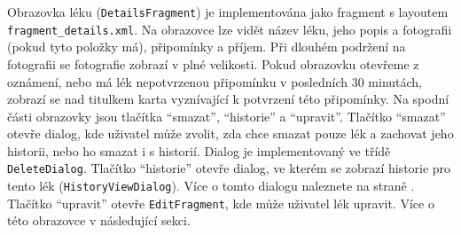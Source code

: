 \documentclass[../TakeYourPill.tex]{subfiles}
\begin{document}
Obrazovka léku (\texttt{DetailsFragment}) je implementována jako fragment s layoutem \texttt{fragment\_details.xml}. Na obrazovce lze vidět název léku, jeho popis a fotografii (pokud tyto položky má), připomínky a příjem. Při dlouhém podržení na fotografii se fotografie zobrazí v plné velikosti. Pokud obrazovku otevřeme z oznámení, nebo má lék nepotvrzenou připomínku v posledních 30 minutách, zobrazí se nad titulkem karta vyznívající k potvrzení této připomínky. Na spodní části obrazovky jsou tlačítka \enquote{smazat}, \enquote{historie} a \enquote{upravit}. Tlačítko \enquote{smazat} otevře dialog, kde uživatel může zvolit, zda chce smazat pouze lék a zachovat jeho historii, nebo ho smazat i s historií. Dialog je implementovaný ve třídě \texttt{DeleteDialog}. Tlačítko \enquote{historie} otevře dialog, ve kterém se zobrazí historie pro tento lék (\texttt{HistoryViewDialog}). Více o tomto dialogu naleznete na straně \pageref{sec:historydialog}. Tlačítko \enquote{upravit} otevře \texttt{EditFragment}, kde může uživatel lék upravit. Více o této obrazovce v následující sekci.
\end{document}
